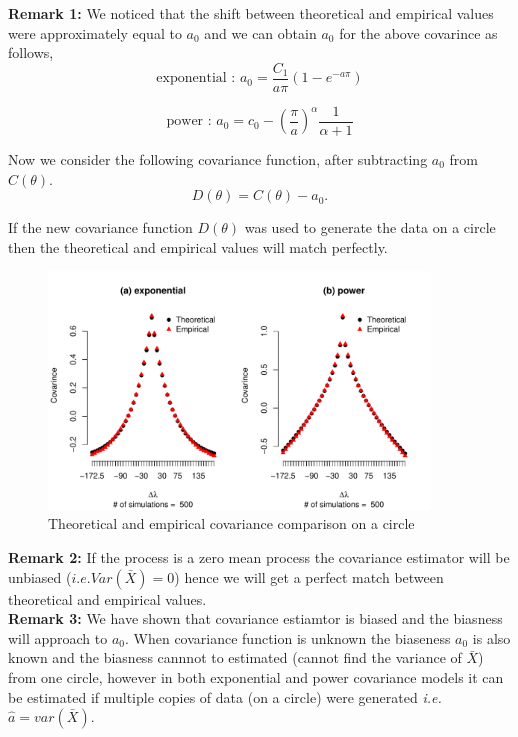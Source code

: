 	      {\bf Remark 1:} We noticed that the shift between theoretical and empirical values were approximately equal to $a_0$ and we can obtain $a_0$ for the above covarince as follows,
	      \[
	    \mbox{exponential : }  	a_0 = \frac{C_1}{a\pi}(1 - e^{-a\pi})
	      \]

	      \[
	    \mbox{power : }  	a_0 = c_0 - \left(\frac{\pi}{a}\right)^{\alpha}\frac{1}{\alpha + 1}
	      \]

	      Now we consider the following covariance function, after subtracting $a_0$ from $C(\theta)$.
	      \[
	      	D(\theta) = C(\theta) - a_0.
	      \]
      
        If the new covariance function $D(\theta)$ was used to generate the data on a circle then the theoretical and empirical values will match perfectly.
        
	      	      
	      \begin{figure}[H]
	      	\centering
	      	\includegraphics[width=0.9\textwidth]{graphs/covarince_circle_remove_a0}
	      	\caption {Theoretical and empirical covariance comparison on a circle}
	      \end{figure}
	      	      
{\bf Remark 2:} If the process is a zero mean process the covariance estimator will be unbiased ($i.e. Var(\bar{X}) = 0$) hence we will get a perfect match between theoretical and empirical values.\\

{\bf Remark 3:} We have shown that covariance estiamtor is biased and the biasness will approach to $a_0$. When covariance function is unknown the biaseness $a_0$ is also known and the biasness cannnot to estimated (cannot find the variance of $\bar{X}$) from one circle, however in both exponential and power covariance models it can be estimated if multiple copies of data (on a circle) were generated {\em i.e.} $\hat{a} = var(\bar{X})$. 

